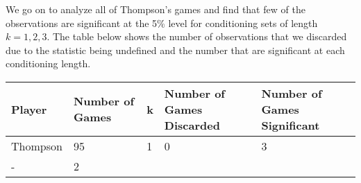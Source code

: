 \documentclass[11pt]{article}
\begin{document}
We go on to analyze all of Thompson's games and find that few of the
observations are significant at the 5\% level for conditioning sets of
length \(k=1,2,3\). The table below shows the number of observations
that we discarded due to the statistic being undefined and the number
that are significant at each conditioning length.

\begin{longtable}[]{@{}lllll@{}}
\toprule
\begin{minipage}[b]{0.05\columnwidth}\raggedright\strut
Player\strut
\end{minipage} & \begin{minipage}[b]{0.05\columnwidth}\raggedright\strut
Number of Games\strut
\end{minipage} & \begin{minipage}[b]{0.05\columnwidth}\raggedright\strut
k\strut
\end{minipage} & \begin{minipage}[b]{0.05\columnwidth}\raggedright\strut
Number of Games Discarded\strut
\end{minipage} & \begin{minipage}[b]{0.05\columnwidth}\raggedright\strut
Number of Games Significant\strut
\end{minipage}\tabularnewline
\midrule
\endhead
\begin{minipage}[t]{0.05\columnwidth}\raggedright\strut
Thompson\strut
\end{minipage} & \begin{minipage}[t]{0.05\columnwidth}\raggedright\strut
95\strut
\end{minipage} & \begin{minipage}[t]{0.05\columnwidth}\raggedright\strut
1\strut
\end{minipage} & \begin{minipage}[t]{0.05\columnwidth}\raggedright\strut
0\strut
\end{minipage} & \begin{minipage}[t]{0.05\columnwidth}\raggedright\strut
3\strut
\end{minipage}\tabularnewline
\begin{minipage}[t]{0.05\columnwidth}\raggedright\strut
-\strut
\end{minipage} & \begin{minipage}[t]{0.05\columnwidth}\raggedright\strut
2\strut
\end{minipage} & \begin{minipage}[t]{0.05\columnwidth}\raggedright\strut

\end{minipage}
\end{longtable}
\end{document}

